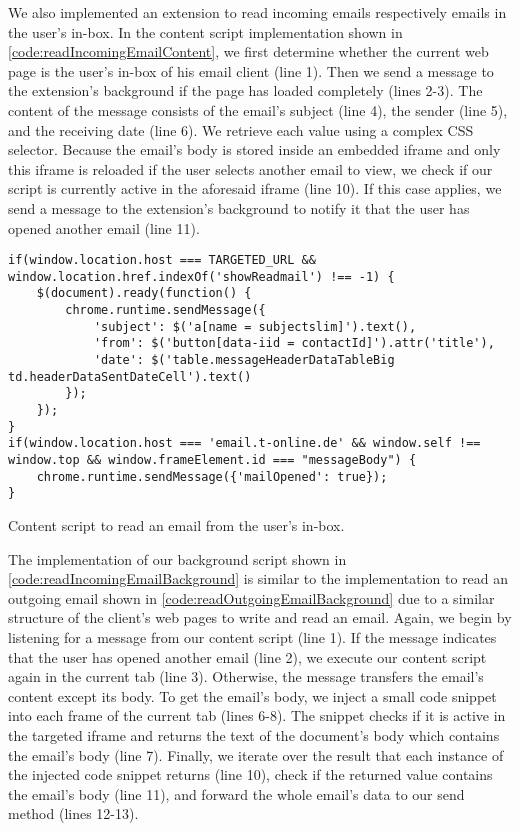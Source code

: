 	We also implemented an extension to read incoming emails respectively emails in the user's in-box. In the content script implementation shown in \autoref{code:readIncomingEmailContent}, we first determine whether the current web page is the user's in-box of his email client (line 1). Then we send a message to the extension's background if the page has loaded completely (lines 2-3). The content of the message consists of the email's subject (line 4), the sender (line 5), and the receiving date (line 6). We retrieve each value using a complex CSS selector. Because the email's body is stored inside an embedded iframe and only this iframe is reloaded if the user selects another email to view, we check if our script is currently active in the aforesaid iframe (line 10). If this case applies, we send a message to the extension's background to notify it that the user has opened another email (line 11).
	
	\begin{code}
		\begin{lstlisting}
if(window.location.host === TARGETED_URL && window.location.href.indexOf('showReadmail') !== -1) {
	$(document).ready(function() {
		chrome.runtime.sendMessage({
			'subject': $('a[name = subjectslim]').text(),
			'from': $('button[data-iid = contactId]').attr('title'),
			'date': $('table.messageHeaderDataTableBig td.headerDataSentDateCell').text()
		});
	});
}
if(window.location.host === 'email.t-online.de' && window.self !== window.top && window.frameElement.id === "messageBody") {
	chrome.runtime.sendMessage({'mailOpened': true});
}
\end{lstlisting}	
		\caption{Content script to read an email from the user's in-box.}
		\label{code:readIncomingEmailContent}
	\end{code}
	
	The implementation of our background script shown in \autoref{code:readIncomingEmailBackground} is similar to the implementation to read an outgoing email shown in \autoref{code:readOutgoingEmailBackground} due to a similar structure of the client's web pages to write and read an email. Again, we begin by listening for a message from our content script (line 1). If the message indicates that the user has opened another email (line 2), we execute our content script again in the current tab (line 3). Otherwise, the message transfers the email's content except its body. To get the email's body, we inject a small code snippet into each frame of the current tab (lines 6-8). The snippet checks if it is active in the targeted iframe and returns the text of the document's body which contains the email's body (line 7). Finally, we iterate over the result that each instance of the injected code snippet returns (line 10), check if the returned value contains the email's body (line 11), and forward the whole email's data to our send method (lines 12-13).
	
